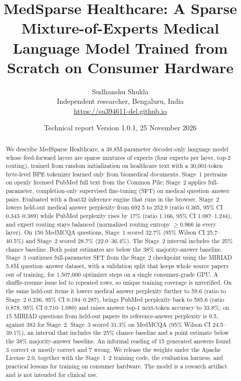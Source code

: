 \documentclass[11pt,a4paper]{article}
\title{\textbf{MedSparse Healthcare: A Sparse Mixture-of-Experts Medical Language Model Trained from Scratch on Consumer Hardware}}
\author{Sudhanshu Shukla\\[2pt]
\small Independent researcher, Bengaluru, India\\
\small \url{https://su394611-del.github.io}}
\date{\small Technical report \textperiodcentered{} Version 1.0.1, 25 November 2026}
\begin{document}
\maketitle

\begin{abstract}
We describe MedSparse Healthcare, a 38.8M-parameter decoder-only language model whose feed-forward layers are sparse mixtures of experts (four experts per layer, top-2 routing), trained from random initialization on healthcare text with a 30,001-token byte-level BPE tokenizer learned only from biomedical documents. Stage~1 pretrains on openly licensed PubMed full text from the Common Pile; Stage~2 applies full-parameter, completion-only supervised fine-tuning (SFT) on medical question--answer pairs. Evaluated with a float32 inference engine that runs in the browser, Stage~2 lowers held-out medical answer perplexity from 692.5 to 252.9 (ratio 0.365, 95\% CI 0.343--0.389) while PubMed perplexity rises by 17\% (ratio 1.166, 95\% CI 1.087--1.244), and expert routing stays balanced (normalized routing entropy $\geq 0.966$ in every layer). On 150 MedMCQA questions, Stage~1 scored 32.7\% (95\% Wilson CI 25.7--40.5\%) and Stage~2 scored 28.7\% (22.0--36.4\%). The Stage~2 interval includes the 25\% chance baseline. Both point estimates are below the 38\% majority-answer baseline. Stage~3 continues full-parameter SFT from the Stage~2 checkpoint using the MIRIAD 5.8M question--answer dataset, with a validation split that keeps whole source papers out of training, for 1,507,000 optimizer steps on a single consumer-grade GPU. A shuffle-resume issue led to repeated rows, so unique training coverage is unverified. On the same held-out items it lowers medical answer perplexity further to 59.6 (ratio to Stage~2 0.236, 95\% CI 0.194--0.287), brings PubMed perplexity back to 585.6 (ratio 0.878, 95\% CI 0.710--1.080) and raises answer top-1 next-token accuracy to 33.8\%; on 15 MIRIAD questions from held-out papers its reference-answer perplexity is 9.5, against 383 for Stage~2. Stage~3 scored 31.3\% on MedMCQA (95\% Wilson CI 24.5--39.1\%), an interval that includes the 25\% chance baseline and a point estimate below the 38\% majority-answer baseline. An informal reading of 15 generated answers found 3 correct or mostly correct and 7 wrong. We release the weights under the Apache License 2.0, together with the Stage~1--2 training code, the evaluation harness, and practical lessons for training on consumer hardware. The model is a research artifact and is not intended for clinical use.
\end{abstract}
\end{document}
